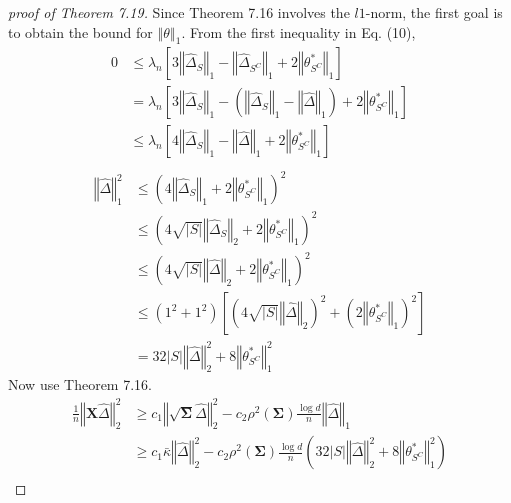 \documentclass[a4paper, 11pt]{article}
\begin{document}
\begin{proof}[proof of Theorem 7.19]

Since Theorem 7.16 involves the $l1$-norm, the first goal is to obtain the bound for $\left\Vert \theta \right\Vert_1$. From the first inequality in Eq. (10), 
\begin{equation}
\begin{split}
0 & \leq \lambda_n\left[3\left\Vert \hat{\Delta}_S \right\Vert_1 - \left\Vert \hat{\Delta}_{S^C} \right\Vert_1 + 2\left\Vert \theta^*_{S^C} \right\Vert_1 \right] \\
 & = \lambda_n\left[3\left\Vert \hat{\Delta}_S \right\Vert_1 - \left(\left\Vert \hat{\Delta}_S \right\Vert_1 - \left\Vert \hat{\Delta} \right\Vert_1\right) + 2\left\Vert \theta^*_{S^C} \right\Vert_1 \right]\\
 & \leq \lambda_n\left[4\left\Vert \hat{\Delta}_S \right\Vert_1 - \left\Vert \hat{\Delta} \right\Vert_1 + 2\left\Vert \theta^*_{S^C} \right\Vert_1 \right] \\
\end{split}
\end{equation}
\begin{equation}
\begin{split}
\left\Vert \hat{\Delta} \right\Vert_1^2 & \leq \left(4\left\Vert \hat{\Delta}_S \right\Vert_1 + 2\left\Vert \theta^*_{S^C} \right\Vert_1\right)^2\\
 & \leq \left(4\sqrt{|S|}\left\Vert \hat{\Delta}_S \right\Vert_2 + 2\left\Vert \theta^*_{S^C} \right\Vert_1\right)^2\\
 & \leq \left(4\sqrt{|S|}\left\Vert \hat{\Delta} \right\Vert_2 + 2\left\Vert \theta^*_{S^C} \right\Vert_1\right)^2\\
 & \leq (1^2 + 1^2)\left[\left(4\sqrt{|S|}\left\Vert \hat{\Delta} \right\Vert_2 \right)^2 + \left( 2\left\Vert \theta^*_{S^C} \right\Vert_1\right)^2 \right]\\
 & = 32|S|\left\Vert\hat{\Delta} \right\Vert_2^2 + 8\left\Vert \theta^*_{S^C} \right\Vert_1^2
\end{split}
\end{equation}
Now use Theorem 7.16. 
\begin{equation}
\begin{split}
\frac{1}{n}\left\Vert\mathbf{X}\hat{\Delta} \right\Vert_2^2 & \geq c_1\left\Vert\sqrt{\mathbf{\Sigma}}\hat{\Delta} \right\Vert_2^2 - c_2\rho^2(\mathbf{\Sigma})\frac{\log d}{n}\left\Vert\hat{\Delta} \right\Vert_1\\
 & \geq c_1\bar{\kappa}\left\Vert\hat{\Delta} \right\Vert_2^2 - c_2\rho^2(\mathbf{\Sigma})\frac{\log d}{n}\left(32|S|\left\Vert\hat{\Delta} \right\Vert_2^2 + 8\left\Vert \theta^*_{S^C} \right\Vert_1^2 \right)\\

\end{split}
\end{equation}
\end{proof}
\end{document}
